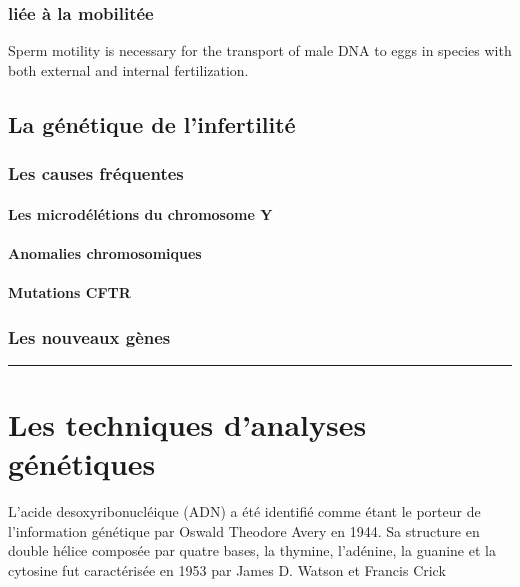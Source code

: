 \documentclass[12pt,twoside]{reedthesis}
\theoremstyle{definition}
\theoremstyle{definition}
\theoremstyle{remark}
\begin{document}
  \subsubsection{liée à la mobilitée}\label{liee-a-la-mobilitee}
  
  Sperm motility is necessary for the transport of male DNA to eggs in
  species with both external and internal fertilization.
  
  \subsection{La génétique de
  l'infertilité}\label{la-genetique-de-linfertilite}
  
  \subsubsection{Les causes fréquentes}\label{les-causes-frequentes}
  
  \paragraph{Les microdélétions du chromosome
  Y}\label{les-microdeletions-du-chromosome-y}
  
  \paragraph{Anomalies chromosomiques}\label{anomalies-chromosomiques}
  
  \paragraph{Mutations CFTR}\label{mutations-cftr}
  
  \subsubsection{Les nouveaux gènes}\label{les-nouveaux-genes}
  
  \begin{center}\rule{0.5\linewidth}{\linethickness}\end{center}
  
  \section{Les techniques d'analyses
  génétiques}\label{les-techniques-danalyses-genetiques}
  
  L'acide desoxyribonucléique (ADN) a été identifié comme étant le porteur
  de l'information génétique par Oswald Theodore Avery en 1944. Sa
  structure en double hélice composée par quatre bases, la thymine,
  l'adénine, la guanine et la cytosine fut caractérisée en 1953 par James
  D. Watson et Francis Crick
  
\end{document}
